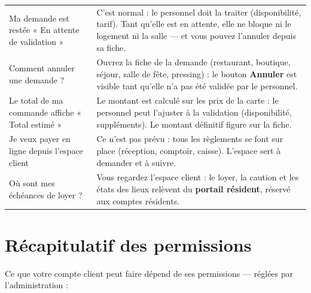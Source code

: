 \documentclass[12pt,a4paper]{article}
\begin{document}
\begin{longtable}{>{\raggedright}p{5cm} p{9cm}}
Ma demande est restée « En attente de validation » & C'est normal : le personnel doit la traiter (disponibilité, tarif). Tant qu'elle est en attente, elle ne bloque ni le logement ni la salle — et vous pouvez l'annuler depuis sa fiche. \\

Comment annuler une demande ? & Ouvrez la fiche de la demande (restaurant, boutique, séjour, salle de fête, pressing) : le bouton \textbf{Annuler} est visible tant qu'elle n'a pas été validée par le personnel. \\

Le total de ma commande affiche « Total estimé » & Le montant est calculé sur les prix de la carte : le personnel peut l'ajuster à la validation (disponibilité, suppléments). Le montant définitif figure sur la fiche. \\

Je veux payer en ligne depuis l'espace client & Ce n'est pas prévu : tous les règlements se font sur place (réception, comptoir, caisse). L'espace sert à demander et à suivre. \\

Où sont mes échéances de loyer ? & Vous regardez l'espace client : le loyer, la caution et les états des lieux relèvent du \textbf{portail résident}, réservé aux comptes résidents. \\

\bottomrule
\end{longtable}

\newpage

\section{Récapitulatif des permissions}

Ce que votre compte client peut faire dépend de ses permissions — réglées par l'administration :
\end{document}
